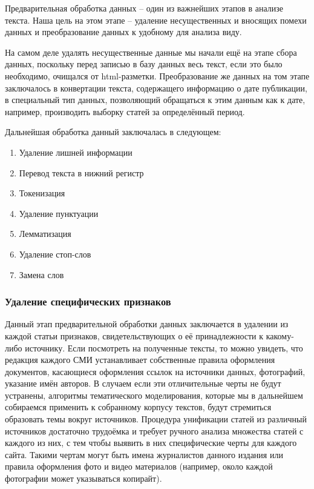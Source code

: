 Предварительная обработка данных -- один из важнейших этапов в анализе текста. Наша цель на этом этапе -- удаление несущественных и вносящих помехи данных и преобразование данных к удобному для анализа виду.

На самом деле удалять несущественные данные мы начали ещё на этапе сбора данных, поскольку перед записью в базу данных весь текст, если это было необходимо, очищался от html-разметки. Преобразование же данных на том этапе заключалось в конвертации текста, содержащего информацию о дате публикации, в специальный тип данных, позволяющий обращаться к этим данным как к дате, например, производить выборку статей за определённый период.

Дальнейшая обработка данный заключалась в следующем:

\begin{enumerate}
\item Удаление лишней информации
\item Перевод текста в нижний регистр
\item Токенизация %
\item Удаление пунктуации
\item Лемматизация
\item Удаление стоп-слов
\item Замена слов
\end{enumerate}

\subsubsection{Удаление специфических признаков}
Данный этап предварительной обработки данных заключается в удалении из каждой статьи признаков, свидетельствующих о её принадлежности к какому-либо источнику. Если посмотреть на полученные тексты, то можно увидеть, что редакция каждого СМИ устанавливает собственные правила оформления документов, касающиеся оформления ссылок на источники данных, фотографий, указание имён авторов. В случаем если эти отличительные черты не будут устранены, алгоритмы тематического моделирования, которые мы в дальнейшем собираемся применить к собранному корпусу текстов, будут стремиться образовать темы вокруг источников. Процедура унификации статей из различный источников достаточно трудоёмка и требует ручного анализа множества статей с каждого из них, с тем чтобы выявить в них специфические черты для каждого сайта. Такими чертам могут быть имена журналистов данного издания или правила оформления фото и видео материалов (например, около каждой фотографии может указываться копирайт).

